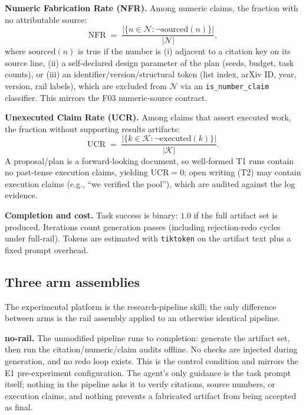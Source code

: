 \documentclass[10pt,twocolumn]{article}
\begin{document}
\textbf{Numeric Fabrication Rate (NFR).} Among numeric claims, the fraction with no attributable source:
\begin{equation}
\mathrm{NFR} \;=\; \frac{|\{n \in \mathcal{N}: \neg \mathrm{sourced}(n)\}|}{|\mathcal{N}|},
\end{equation}
where $\mathrm{sourced}(n)$ is true if the number is (i) adjacent to a citation key on its source line, (ii) a self-declared design parameter of the plan (seeds, budget, task counts), or (iii) an identifier/version/structural token (list index, arXiv ID, year, version, rail labels), which are excluded from $\mathcal{N}$ via an \texttt{is\_number\_claim} classifier. This mirrors the F03 numeric-source contract.

\textbf{Unexecuted Claim Rate (UCR).} Among claims that assert executed work, the fraction without supporting results artifacts:
\begin{equation}
\mathrm{UCR} \;=\; \frac{|\{k \in \mathcal{K}: \neg \mathrm{executed}(k)\}|}{|\mathcal{K}|}.
\end{equation}
A proposal/plan is a forward-looking document, so well-formed T1 runs contain no past-tense execution claims, yielding $\mathrm{UCR}=0$; open writing (T2) may contain execution claims (e.g., ``we verified the pool''), which are audited against the log evidence.

\textbf{Completion and cost.} Task success is binary: $1.0$ if the full artifact set is produced. Iterations count generation passes (including rejection-redo cycles under full-rail). Tokens are estimated with \texttt{tiktoken} on the artifact text plus a fixed prompt overhead.

\subsection{Three arm assemblies}
The experimental platform is the research-pipeline skill; the only difference between arms is the rail assembly applied to an otherwise identical pipeline.

\textbf{no-rail.} The unmodified pipeline runs to completion: generate the artifact set, then run the citation/numeric/claim audits offline. No checks are injected during generation, and no redo loop exists. This is the control condition and mirrors the E1 pre-experiment configuration. The agent's only guidance is the task prompt itself; nothing in the pipeline asks it to verify citations, source numbers, or execution claims, and nothing prevents a fabricated artifact from being accepted as final.
\end{document}
